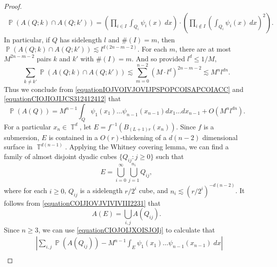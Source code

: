 \documentclass[dvipsnames,letterpaper,12pt]{article}
\numberwithin{equation}{section}
\DeclareMathOperator{\TT}{\mathbb{T}}
\numberwithin{theorem}{section}
\DeclareMathOperator{\PP}{\mathbb{P}}
\begin{document}
\begin{proof}
    \begin{equation}
    \begin{split}
        \PP(A(Q;k) \cap A(Q;k')) = \left( \prod_{i \in I} \int_{Q_i} \psi_i(x)\; dx \right) \cdot \left( \prod_{i \not \in I} \left( \int_{Q_i} \psi_i(x)\; dx \right)^2 \right).
    \end{split}
    \end{equation}
    In particular, if $Q$ has sidelength $l$ and $\#(I) = m$, then $\PP(A(Q;k) \cap A(Q;k')) \lesssim l^{d(2n - m - 2)}$. For each $m$, there are at most $M^{2n - m - 2}$ pairs $k$ and $k'$ with $\#(I) = m$. And so provided $l^d \leq 1/M$,
    \begin{equation} \label{equationCIOJIOJIJCS312412412}
        \sum_{k \neq k'} \PP(A(Q;k) \cap A(Q;k')) \lesssim \sum_{m = 0}^{n-2} (M \cdot l^d)^{2n-m-2} \lesssim M^n l^{dn}.
    \end{equation}
    Thus we conclude from \eqref{equationIOJVOIVJOVIJPSPOPCOISAPCOIACC} and \eqref{equationCIOJIOJIJCS312412412} that
    \begin{equation} \label{equationCIOJOIJXOISJOIj}
        \PP(A(Q)) = M^{n-1} \int_Q \psi_1(x_1) \dots \psi_{n-1}(x_{n-1}) dx_1 \dots dx_{n-1} + O(M^n l^{dn}).
    \end{equation}
    For a particular $x_n \in \TT^d$, let $E = f^{-1}(B_{(L+1)r}(x_n))$. Since $f$ is a submersion, $E$ is contained in a $O(r)$-thickening of a $d(n-2)$ dimensional surface in $\TT^{d(n-1)}$. Applying the Whitney covering lemma, we can find a family of almost disjoint dyadic cubes $\{ Q_{ij} : j \geq 0 \}$ such that
    \begin{equation} \label{equationCOIJIOVJVIVIVIII2231}
        E = \bigcup_{i = 0}^\infty \bigcup_{j = 1}^{n_i} Q_{ij},
    \end{equation}
    where for each $i \geq 0$, $Q_{ij}$ is a sidelength $r/2^i$ cube, and $n_i \lesssim (r/2^i)^{-d(n-2)}$. It follows from \eqref{equationCOIJIOVJVIVIVIII2231} that
    \begin{equation} \label{equationCOJIAWOIJCAWOIJOI}
        A(E) = \bigcup_{i,j} A(Q_{ij}).
    \end{equation}
    Since $n \geq 3$, we can use \eqref{equationCIOJOIJXOISJOIj} to calculate that
    \begin{equation} \label{equationCOIJCOIJSI}
    \begin{split}
        &\left| \sum_{i,j} \PP(A(Q_{ij})) - M^{n-1} \int_E \psi_1(x_1) \dots \psi_{n-1}(x_{n-1})\; dx \right|\\

\end{split}
\end{equation}
\end{proof}
\end{document}
